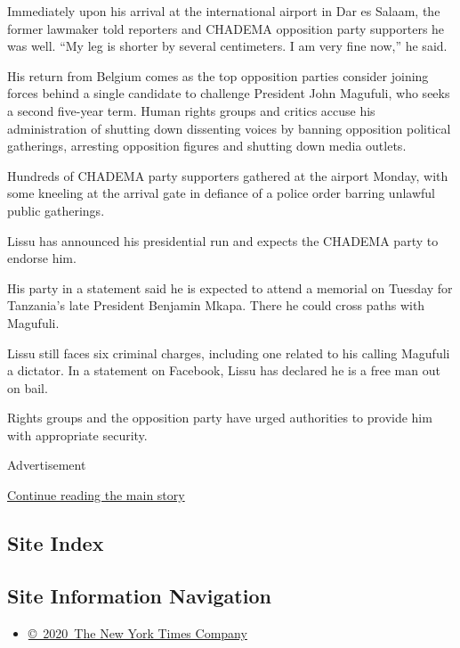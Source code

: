 Immediately upon his arrival at the international airport in Dar es
Salaam, the former lawmaker told reporters and CHADEMA opposition party
supporters he was well. ``My leg is shorter by several centimeters. I am
very fine now,'' he said.

His return from Belgium comes as the top opposition parties consider
joining forces behind a single candidate to challenge President John
Magufuli, who seeks a second five-year term. Human rights groups and
critics accuse his administration of shutting down dissenting voices by
banning opposition political gatherings, arresting opposition figures
and shutting down media outlets.

Hundreds of CHADEMA party supporters gathered at the airport Monday,
with some kneeling at the arrival gate in defiance of a police order
barring unlawful public gatherings.

Lissu has announced his presidential run and expects the CHADEMA party
to endorse him.

His party in a statement said he is expected to attend a memorial on
Tuesday for Tanzania's late President Benjamin Mkapa. There he could
cross paths with Magufuli.

Lissu still faces six criminal charges, including one related to his
calling Magufuli a dictator. In a statement on Facebook, Lissu has
declared he is a free man out on bail.

Rights groups and the opposition party have urged authorities to provide
him with appropriate security.

Advertisement

\protect\hyperlink{after-bottom}{Continue reading the main story}

\hypertarget{site-index}{%
\subsection{Site Index}\label{site-index}}

\hypertarget{site-information-navigation}{%
\subsection{Site Information
Navigation}\label{site-information-navigation}}

\begin{itemize}
\tightlist
\item
  \href{https://help.nytimes.com/hc/en-us/articles/115014792127-Copyright-notice}{©~2020~The
  New York Times Company}
\end{itemize}

